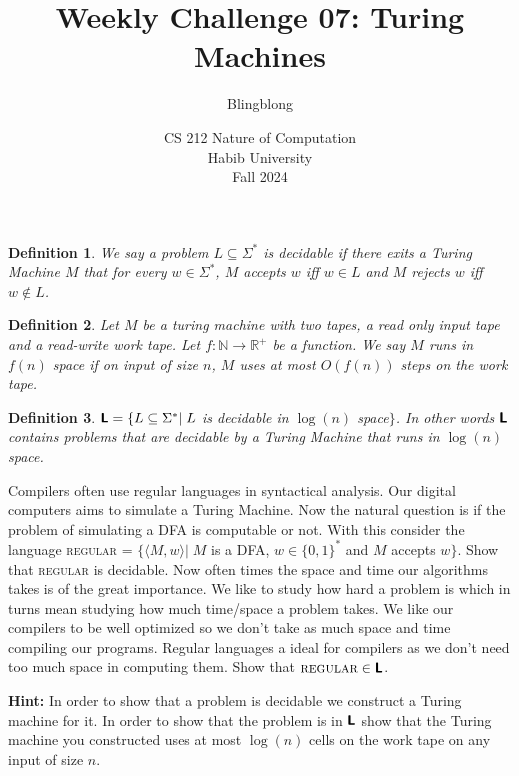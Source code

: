 \documentclass[a4paper]{exam}
\title{Weekly Challenge 07: Turing Machines}
\author{Blingblong} %
\date{CS 212 Nature of Computation\\Habib University\\Fall 2024}
\newcommand{\classX}[1]{\ensuremath{\text{\textsf{\textbf{#1}}}}}
\newcommand{\classL}{\classX{L}}
\newtheorem{definition}{Definition}
\begin{document}
\maketitle

\begin{questions}
  
    \begin{definition}
        We say a problem $L \subseteq \Sigma^*$ is decidable if there exits a Turing Machine $M$ that for every $w \in \Sigma^*$, $M$ \emph{accepts} $w$ iff $w \in L$ and $M$ \emph{rejects} $w$ iff $w \not\in L$.
    \end{definition}
    \begin{definition}
        Let $M$ be a turing machine with two tapes, a read only input tape and a read-write work tape. Let $f: \mathbb{N} \to \mathbb{R}^+$ be a function. We say $M$ runs in $f(n)$ space if on input of size $n$, $M$ uses at most $O(f(n))$ steps on the work tape.
    \end{definition}
    \begin{definition}
        $\classL = \{L \subseteq \Sigma^* |\; L$ is decidable in $\log(n)$ space$\}$. In other words $\classL$ contains problems that are decidable by a Turing Machine that runs in $\log(n)$ space.
    \end{definition}
    Compilers often use regular languages in syntactical analysis. Our digital computers aims to simulate a Turing Machine. Now the natural question is if the problem of simulating a DFA is computable or not.
    With this consider the language \textsc{regular} = $\{\langle M, w\rangle |\;M$ is a DFA, $w \in \{0,1\}^*$ and $M$ accepts $w \}$. 
    Show that \textsc{regular} is decidable.
    Now often times the space and time our algorithms takes is of the great importance. We like to study how hard a problem is which in turns mean studying how much time/space a problem takes. We like our compilers to be well optimized so we don't take as much space and time compiling our programs. Regular languages a ideal for compilers as we don't need too much space in computing them. Show that $\textsc{regular} \in \classL$. 
    
    \textbf{Hint:} In order to show that a problem is decidable we construct a Turing machine for it. In order to show that the problem is in $\classL$ show that the Turing machine you constructed uses at most $\log(n)$ cells on the work tape on any input of size $n$.
  \begin{solution}
  \end{solution}
\end{questions}
\end{document}
